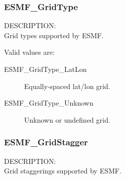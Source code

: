 
\subsubsection{ESMF\_GridType}

{\sf DESCRIPTION:\\}
Grid types supported by ESMF.

Valid values are:
\begin{description}
   \item [ESMF\_GridType\_LatLon]
         Equally-spaced lat/lon grid.
   \item [ESMF\_GridType\_Unknown]
         Unknown or undefined grid.

\end{description}

\subsubsection{ESMF\_GridStagger}

{\sf DESCRIPTION:\\}
Grid staggerings supported by ESMF.

